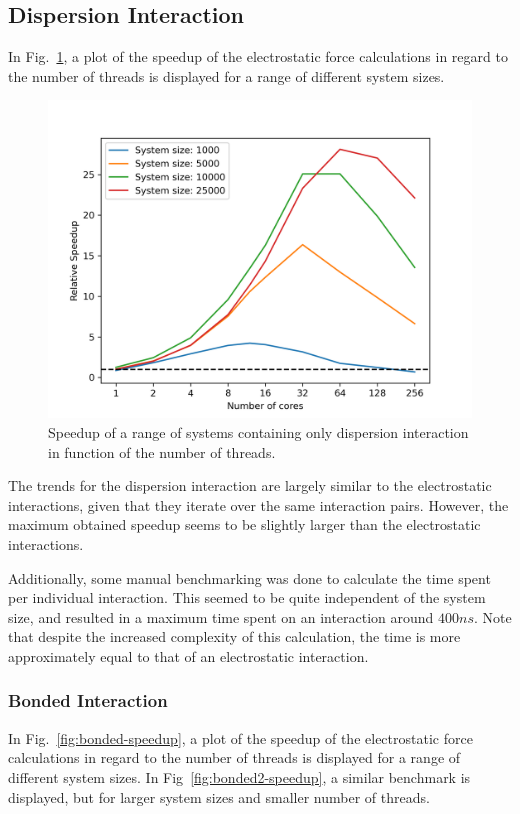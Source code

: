 \documentclass[conference]{IEEEtran}
\begin{document}
    \subsection{Dispersion Interaction}

    In Fig.~\ref{fig:dispersion-speedup}, a plot of the speedup of the electrostatic force calculations 
    in regard to the number of threads is displayed for a range of different system sizes.
    \begin{figure}[H]
        \centering
        \includegraphics[width=\linewidth]{./images/dispersion_scaling.png} %
        \caption{Speedup of a range of systems containing only dispersion interaction in function of the number 
        of threads.}\label{fig:dispersion-speedup}
    \end{figure}

    The trends for the dispersion interaction are largely similar to the electrostatic interactions, given that
    they iterate over the same interaction pairs. However, the maximum obtained speedup seems to be slightly
    larger than the electrostatic interactions.

    Additionally, some manual benchmarking was done to calculate the time spent per individual interaction. This
    seemed to be quite independent of the system size, and resulted in a maximum time spent on an interaction 
    around $400 ns$. Note that despite the increased complexity of this calculation, the time is more approximately
    equal to that of an electrostatic interaction.

    \subsubsection{Bonded Interaction}
    In Fig.~\ref{fig:bonded-speedup}, a plot of the speedup of the electrostatic force calculations 
    in regard to the number of threads is displayed for a range of different system sizes. In 
    Fig~\ref{fig:bonded2-speedup}, a similar benchmark is displayed, but for larger system sizes and smaller
    number of threads.
\end{document}
